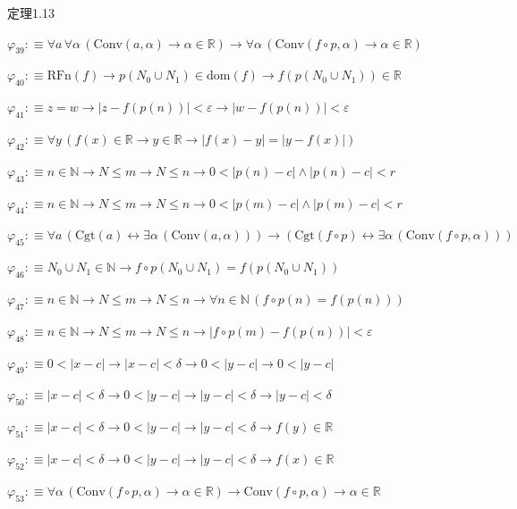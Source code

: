 \begin{fullproof}{定理1.13}
\begin{abbrevlist}
\item $\varphi_{39} :\equiv \forall a\,\forall \alpha\,(\mathrm{Conv}(a,\alpha) \to \alpha \in \mathbb{R}) \to \forall \alpha\,(\mathrm{Conv}(f \circ p,\alpha) \to \alpha \in \mathbb{R})$
\item $\varphi_{40} :\equiv \mathrm{RFn}(f) \to p(N_{0} \cup N_{1}) \in \mathrm{dom}(f) \to f(p(N_{0} \cup N_{1})) \in \mathbb{R}$
\item $\varphi_{41} :\equiv z = w \to \lvert z - f(p(n)) \rvert < \varepsilon \to \lvert w - f(p(n)) \rvert < \varepsilon$
\item $\varphi_{42} :\equiv \forall y\,(f(x) \in \mathbb{R} \to y \in \mathbb{R} \to \lvert f(x) - y \rvert = \lvert y - f(x) \rvert)$
\item $\varphi_{43} :\equiv n \in \mathbb{N} \to N \leq m \to N \leq n \to 0 < \lvert p(n) - c \rvert \land \lvert p(n) - c \rvert < r$
\item $\varphi_{44} :\equiv n \in \mathbb{N} \to N \leq m \to N \leq n \to 0 < \lvert p(m) - c \rvert \land \lvert p(m) - c \rvert < r$
\item $\varphi_{45} :\equiv \forall a\,(\mathrm{Cgt}(a) \leftrightarrow \exists \alpha\,(\mathrm{Conv}(a,\alpha))) \to (\mathrm{Cgt}(f \circ p) \leftrightarrow \exists \alpha\,(\mathrm{Conv}(f \circ p,\alpha)))$
\item $\varphi_{46} :\equiv N_{0} \cup N_{1} \in \mathbb{N} \to f \circ p(N_{0} \cup N_{1}) = f(p(N_{0} \cup N_{1}))$
\item $\varphi_{47} :\equiv n \in \mathbb{N} \to N \leq m \to N \leq n \to \forall n \in \mathbb{N}\,(f \circ p(n) = f(p(n)))$
\item $\varphi_{48} :\equiv n \in \mathbb{N} \to N \leq m \to N \leq n \to \lvert f \circ p(m) - f(p(n)) \rvert < \varepsilon$
\item $\varphi_{49} :\equiv 0 < \lvert x - c \rvert \to \lvert x - c \rvert < \delta \to 0 < \lvert y - c \rvert \to 0 < \lvert y - c \rvert$
\item $\varphi_{50} :\equiv \lvert x - c \rvert < \delta \to 0 < \lvert y - c \rvert \to \lvert y - c \rvert < \delta \to \lvert y - c \rvert < \delta$
\item $\varphi_{51} :\equiv \lvert x - c \rvert < \delta \to 0 < \lvert y - c \rvert \to \lvert y - c \rvert < \delta \to f(y) \in \mathbb{R}$
\item $\varphi_{52} :\equiv \lvert x - c \rvert < \delta \to 0 < \lvert y - c \rvert \to \lvert y - c \rvert < \delta \to f(x) \in \mathbb{R}$
\item $\varphi_{53} :\equiv \forall \alpha\,(\mathrm{Conv}(f \circ p,\alpha) \to \alpha \in \mathbb{R}) \to \mathrm{Conv}(f \circ p,\alpha) \to \alpha \in \mathbb{R}$

\end{abbrevlist}
\end{fullproof}
